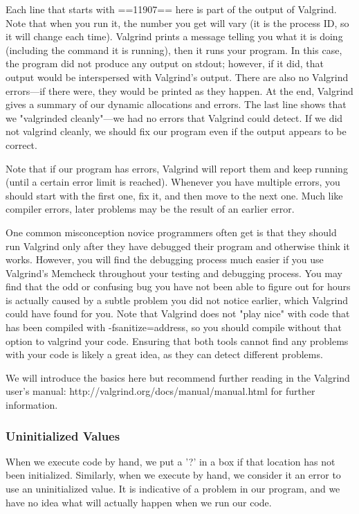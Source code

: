 \documentclass[11pt, a4paper]{article}
\begin{document}
Each line that starts with ==11907== here is part of the output of Valgrind. Note that when you run it, the number you get will vary (it is the process ID, so it will change each time). Valgrind prints a message telling you what it is doing (including the command it is running), then it runs your program. In this case, the program did not produce any output on stdout; however, if it did, that output would be interspersed with Valgrind's output. There are also no Valgrind errors—if there were, they would be printed as they happen. At the end, Valgrind gives a summary of our dynamic allocations and errors. The last line shows that we "valgrinded cleanly"—we had no errors that Valgrind could detect. If we did not valgrind cleanly, we should fix our program even if the output appears to be correct.

Note that if our program has errors, Valgrind will report them and keep running (until a certain error limit is reached). Whenever you have multiple errors, you should start with the first one, fix it, and then move to the next one. Much like compiler errors, later problems may be the result of an earlier error.

One common misconception novice programmers often get is that they should run Valgrind only after they have debugged their program and otherwise think it works. However, you will find the debugging process much easier if you use Valgrind's Memcheck throughout your testing and debugging process. You may find that the odd or confusing bug you have not been able to figure out for hours is actually caused by a subtle problem you did not notice earlier, which Valgrind could have found for you. Note that Valgrind does not "play nice" with code that has been compiled with -fsanitize=address, so you should compile without that option to valgrind your code. Ensuring that both tools cannot find any problems with your code is likely a great idea, as they can detect different problems.

We will introduce the basics here but recommend further reading in the Valgrind user’s manual: http://valgrind.org/docs/manual/manual.html for further information.


\subsubsection{Uninitialized Values}%
\label{ssub:uninitialized_values}




When we execute code by hand, we put a '?' in a box if that location has not been initialized. Similarly, when we execute by hand, we consider it an error to use an uninitialized value. It is indicative of a problem in our program, and we have no idea what will actually happen when we run our code.
\end{document}
